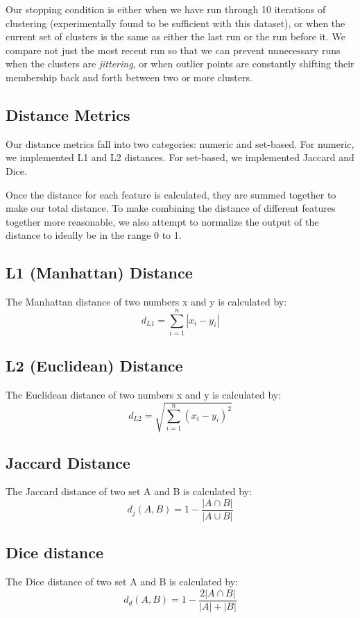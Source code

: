 \documentclass{article}
\begin{document}
      Our stopping condition is either when we have run through 10 iterations of clustering (experimentally found to be sufficient with this dataset),
      or when the current set of clusters is the same as either the last run or the run before it.
      We compare not just the most recent run so that we can prevent unnecessary runs when the clusters are \textit{jittering},
      or when outlier points are constantly shifting their membership back and forth between two or more clusters.

   \subsection{Distance Metrics}
      Our distance metrics fall into two categories: numeric and set-based.
      For numeric, we implemented L1 and L2 distances.
      For set-based, we implemented Jaccard and Dice.

      Once the distance for each feature is calculated, they are summed together to make our total distance.
      To make combining the distance of different features together more reasonable, we also attempt to normalize the output of the distance to ideally be in the range 0 to 1.

      \subsection{L1 (Manhattan) Distance}
         The Manhattan distance of two numbers x and y is calculated by:
         $$ d_{L1} = \sum_{i = 1}^{n} | x_{i} - y_{i} | $$

      \subsection{L2 (Euclidean) Distance}
         The Euclidean distance of two numbers x and y is calculated by:
         $$ d_{L2} = \sqrt{\sum_{i = 1}^{n}(x_{i} - y_{i})^2} $$

      \subsection{Jaccard Distance}
         The Jaccard distance of two set A and B is calculated by:
         $$ d_{j}(A, B) = 1 - \frac{| A \cap B |}{| A \cup B |}$$

      \subsection{Dice distance}
         The Dice distance of two set A and B is calculated by:
         $$d_{d}(A, B) = 1 - \frac{2 | A \cap B |}{|A| + |B|} $$
\end{document}
